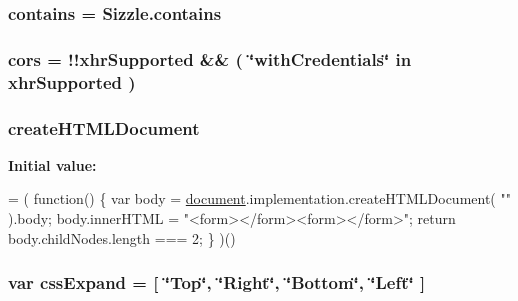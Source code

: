 \subsubsection[{\texorpdfstring{contains}{contains}}]{ contains = Sizzle.\+contains}\hypertarget{jquery-3_82_81_8js_ac28d955147e97e41b2a7cd70f91ab219}{}\label{jquery-3_82_81_8js_ac28d955147e97e41b2a7cd70f91ab219}
\subsubsection[{\texorpdfstring{cors}{cors}}]{ cors = !!{\bf xhr\+Supported} \&\& ( \char`\"{}with\+Credentials\char`\"{} in {\bf xhr\+Supported} )}\hypertarget{jquery-3_82_81_8js_a8d50fb3dc42e0b26d2ed6ba1db947725}{}\label{jquery-3_82_81_8js_a8d50fb3dc42e0b26d2ed6ba1db947725}
\subsubsection[{\texorpdfstring{create\+H\+T\+M\+L\+Document}{createHTMLDocument}}]{ create\+H\+T\+M\+L\+Document}\hypertarget{jquery-3_82_81_8js_a116f377daf012bb29aa7cf96d18d3af0}{}\label{jquery-3_82_81_8js_a116f377daf012bb29aa7cf96d18d3af0}
{\bfseries Initial value\+:}
\begin{DoxyCode}
= ( \textcolor{keyword}{function}() \{
    var body = \hyperlink{jquery-3_82_81_8js_af61dbe660d8213297c7fed5b5c99d223}{document}.implementation.createHTMLDocument( \textcolor{stringliteral}{""} ).body;
    body.innerHTML = \textcolor{stringliteral}{"<form></form><form></form>"};
    \textcolor{keywordflow}{return} body.childNodes.length === 2;
\} )()
\end{DoxyCode}
\subsubsection[{\texorpdfstring{css\+Expand}{cssExpand}}]{\setlength{\rightskip}{0pt plus 5cm}var css\+Expand = \mbox{[} \char`\"{}Top\char`\"{}, \char`\"{}Right\char`\"{}, \char`\"{}Bottom\char`\"{}, \char`\"{}Left\char`\"{} \mbox{]}}\hypertarget{jquery-3_82_81_8js_ad1957da629ea5bd26d692d17f4cf72a1}{}\label{jquery-3_82_81_8js_ad1957da629ea5bd26d692d17f4cf72a1}
